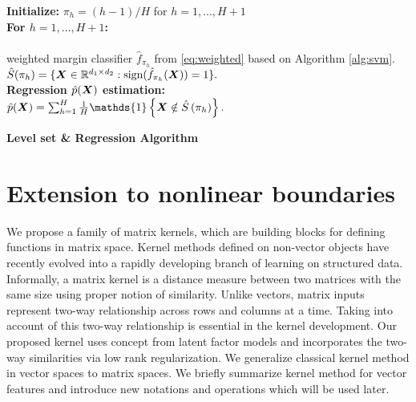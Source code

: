 \documentclass[mathptm]{statsoc}
\begin{document}
 \begin{algorithm}[h]
 \label{alg:regest}
{\bf Initialize:} $\pi_h = (h-1)/H$ for $h = 1, \ldots, H+1$\\
{\bf For $h = 1,\ldots, H+1$:}\\
\hspace*{.5cm}{\bf Level set $\hat S(\pi_h)$ estimation:}\\
\hspace*{1cm}{\bf Train} weighted margin classifier $\hat f_{\pi_h}$ from \eqref{eq:weighted} based on Algorithm \ref{alg:svm}.
\\[.1cm]
\hspace*{.9cm} $\hat S(\pi_h) = \{\bm X\in\mathbb{R}^{d_1\times d_2}:\text{sign}(\hat f_{\pi_h}(\bm X)) = 1\}.$
\\[.1cm]
{\bf Regression $\hat p(\bm X)$ estimation:} \\[.1cm]
\hspace*{.4cm} $\hat p(\mX) = \sum_{h=1}^H\frac{1}{H}\mathds{1}\left\{\mX\notin\hat S\left(\pi_h\right)\right\}.$\\[.1cm]
    \caption{{\bf Level set \& Regression Algorithm} }
\end{algorithm}

\section{Extension to nonlinear boundaries}\label{subsec:nonlinear class}
We propose a family of matrix kernels, which are building blocks for defining functions in matrix space. Kernel methods defined on non-vector objects have recently evolved into a rapidly developing branch of learning on structured data. Informally, a matrix kernel is a distance measure between two matrices with the same size using proper notion of similarity. Unlike vectors, matrix inputs represent two-way relationship across rows and columns at a time. Taking into account of this two-way relationship is essential in the kernel development.
Our proposed kernel uses concept from latent factor models and incorporates the two-way similarities via low rank regularization. 
We generalize classical kernel method in vector spaces to matrix spaces. We briefly summarize kernel method for vector features and introduce new notations and operations which will be used later.
\end{document}
